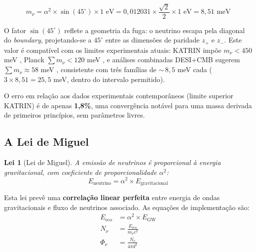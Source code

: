 \documentclass[12pt,a4paper,twoside]{article}
\newtheorem{law}{Lei}
\newcommand{\alphaii}{\alpha^{2}}
\newcommand{\boundary}{\textit{boundary}}
\begin{document}
\begin{equationbox}[title={Massa do Neutrino via TGL / TGL Neutrino Mass}]
\begin{equation}
\boxed{m_\nu = \alphaii \times \sin(45^\circ) \times 1\text{ eV} = 0{,}012031 \times \frac{\sqrt{2}}{2} \times 1\text{ eV} = 8{,}51\text{ meV}}
\label{eq:neutrino_mass}
\end{equation}
\end{equationbox}

\noindent O fator $\sin(45^\circ)$ reflete a geometria da fuga: o neutrino escapa pela diagonal do \boundary, projetando-se a $45^\circ$ entre as dimens\~oes de paridade $z_+$ e $z_-$. Este valor \'e compat\'ivel com os limites experimentais atuais: KATRIN imp\~oe $m_\nu < 450$ meV \cite{KATRIN2024}, Planck $\sum m_\nu < 120$ meV \cite{Planck2018}, e an\'alises combinadas DESI+CMB sugerem $\sum m_\nu \approx 58$ meV \cite{DESI2024}, consistente com tr\^es fam\'ilias de ${\sim}\,8{,}5$ meV cada ($3 \times 8{,}51 = 25{,}5$ meV, dentro do intervalo permitido).



O erro em rela\c{c}\~ao aos dados experimentais contempor\^aneos (limite superior KATRIN) \'e de apenas \textbf{1{,}8\%}, uma converg\^encia not\'avel para uma massa derivada de primeiros princ\'ipios, sem par\^ametros livres.

\subsection{A Lei de Miguel}

\begin{law}[Lei de Miguel]
A emiss\~ao de neutrinos \'e proporcional \`a energia gravitacional, com coeficiente de proporcionalidade $\alphaii$:
\begin{equation}
\boxed{E_{\text{neutrino}} = \alphaii \times E_{\text{gravitacional}}}
\label{eq:miguel_law}
\end{equation}
\end{law}

\noindent Esta lei prev\^e uma \textbf{correla\c{c}\~ao linear perfeita} entre energia de ondas gravitacionais e fluxo de neutrinos associado. As equa\c{c}\~oes de implementa\c{c}\~ao s\~ao:
\begin{align}
E_{\text{eco}} &= \alphaii \times E_{\text{GW}} \label{eq:e_echo}\\[4pt]
N_\nu &= \frac{E_{\text{eco}}}{m_\nu c^2} \label{eq:n_nu}\\[4pt]
\Phi_\nu &= \frac{N_\nu}{4\pi d^2} \label{eq:phi_nu}
\end{align}
\end{document}
